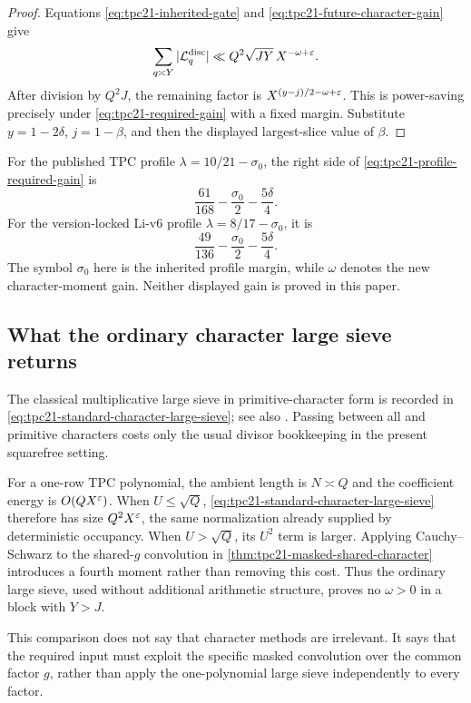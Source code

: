 \begin{proof}
Equations \eqref{eq:tpc21-inherited-gate} and
\eqref{eq:tpc21-future-character-gain} give
\[
 \sum_{q\asymp Y}|\mathcal L_q^{\rm disc}|
 \ll Q^2\sqrt{JY}\,X^{-\omega+\varepsilon}.
\]
After division by \(Q^2J\), the remaining factor is
\(X^{(y-j)/2-\omega+\varepsilon}\).  This is power-saving precisely under
\eqref{eq:tpc21-required-gain} with a fixed margin.  Substitute
\(y=1-2\delta\), \(j=1-\beta\), and then the displayed largest-slice
value of \(\beta\).
\end{proof}

For the published TPC profile
\(\lambda=10/21-\sigma_0\), the right side of
\eqref{eq:tpc21-profile-required-gain} is
\[
 \frac{61}{168}-\frac{\sigma_0}{2}-\frac{5\delta}{4}.
\]
For the version-locked Li-v6 profile
\(\lambda=8/17-\sigma_0\), it is
\[
 \frac{49}{136}-\frac{\sigma_0}{2}-\frac{5\delta}{4}.
\]
The symbol \(\sigma_0\) here is the inherited profile margin, while
\(\omega\) denotes the new character-moment gain.  Neither displayed
gain is proved in this paper.

\subsection{What the ordinary character large sieve returns}

The classical multiplicative large sieve in primitive-character form is
recorded in \eqref{eq:tpc21-standard-character-large-sieve}; see also
\citet[Chapter~7]{IwaniecKowalski2004}.  Passing between all and primitive
characters costs only the usual divisor bookkeeping in the present
squarefree setting.

For a one-row TPC polynomial, the ambient length is \(N\asymp Q\) and
the coefficient energy is \(O(QX^\varepsilon)\).  When \(U\le\sqrt Q\),
\eqref{eq:tpc21-standard-character-large-sieve} therefore has size
\(Q^2X^\varepsilon\), the same normalization already supplied by deterministic
occupancy.  When \(U>\sqrt Q\), its \(U^2\) term is larger.  Applying
Cauchy--Schwarz to the shared-\(g\) convolution in
\cref{thm:tpc21-masked-shared-character} introduces a fourth
moment rather than removing this cost.  Thus the ordinary large sieve,
used without additional arithmetic structure, proves no
\(\omega>0\) in a block with \(Y>J\).

This comparison does not say that character methods are irrelevant.
It says that the required input must exploit the specific masked
convolution over the common factor \(g\), rather than apply the
one-polynomial large sieve independently to every factor.

